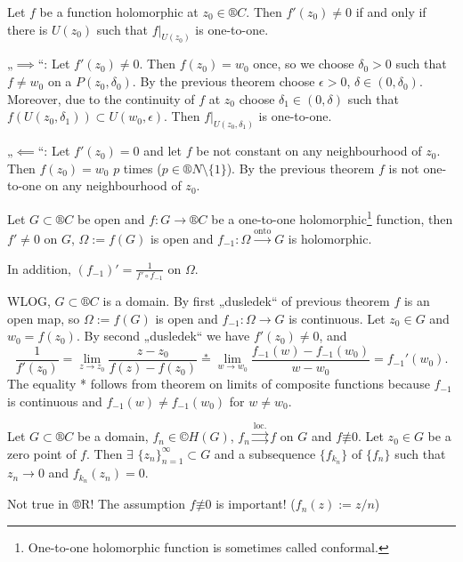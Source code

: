 \documentclass[12pt]{article}					%
\begin{document}
\begin{dusledek}
	Let $f$ be a function holomorphic at $z_0 \in ®C$. Then $f'(z_0) ≠ 0$ if and only if there is $U(z_0)$ such that $f|_{U(z_0)}$ is one-to-one.

	\begin{dukazin}
		„$\implies$“: Let $f'(z_0) ≠ 0$. Then $f(z_0) = w_0$ once, so we choose $\delta_0 > 0$ such that $f ≠ w_0$ on a $P(z_0, \delta_0)$. By the previous theorem choose $\epsilon > 0$, $\delta \in (0, \delta_0)$. Moreover, due to the continuity of $f$ at $z_0$ choose $\delta_1 \in (0, \delta)$ such that $f(U(z_0, \delta_1)) \subset U(w_0, \epsilon)$. Then $f|_{U(z_0, \delta_1)}$ is one-to-one.

		„$\impliedby$“: Let $f'(z_0) = 0$ and let $f$ be not constant on any neighbourhood of $z_0$. Then $f(z_0) = w_0$ $p$ times ($p \in ®N \setminus \{1\}$). By the previous theorem $f$ is not one-to-one on any neighbourhood of $z_0$.
	\end{dukazin}
\end{dusledek}

\begin{veta}
	Let $G \subset ®C$ be open and $f: G \rightarrow ®C$ be a one-to-one holomorphic\footnote{One-to-one holomorphic function is sometimes called conformal.} function, then $f' ≠ 0$ on $G$, $\Omega := f(G)$ is open and $f_{-1}: \Omega \overset{\text{onto}}\rightarrow G$ is holomorphic.

	In addition, $(f_{-1})' = \frac{1}{f' \circ f_{-1}}$ on $\Omega$.

	\begin{dukazin}
		WLOG, $G \subset ®C$ is a domain. By first „dusledek“ of previous theorem $f$ is an open map, so $\Omega := f(G)$ is open and $f_{-1}: \Omega \rightarrow G$ is continuous. Let $z_0 \in G$ and $w_0 = f(z_0)$. By second „dusledek“ we have $f'(z_0) ≠ 0$, and
		$$ \frac{1}{f'(z_0)} = \lim_{z \rightarrow z_0} \frac{z - z_0}{f(z) - f(z_0)} \overset*= \lim_{w \rightarrow w_0} \frac{f_{-1}(w) - f_{-1}(w_0)}{w - w_0} = f_{-1}'(w_0). $$
		The equality * follows from theorem on limits of composite functions because $f_{-1}$ is continuous and $f_{-1}(w) ≠ f_{-1}(w_0)$ for $w ≠ w_0$.
	\end{dukazin}
\end{veta}

\begin{veta}[Hurwitz]
	Let $G \subset ®C$ be a domain, $f_n \in ©H(G)$, $f_n \overset{\text{loc.}}\rightrightarrows f$ on $G$ and $f \not≡ 0$. Let $z_0 \in G$ be a zero point of $f$. Then $\exists$ $\{z_n\}_{n = 1}^∞ \subset G$ and a subsequence $\{f_{k_n}\}$ of $\{f_n\}$ such that $z_n \rightarrow 0$ and $f_{k_n}(z_n) = 0$.

	\begin{poznamkain}
		Not true in ®R! The assumption $f \not≡ 0$ is important! ($f_n(z) := z/n$)
	\end{poznamkain}
\end{veta}
\end{document}
